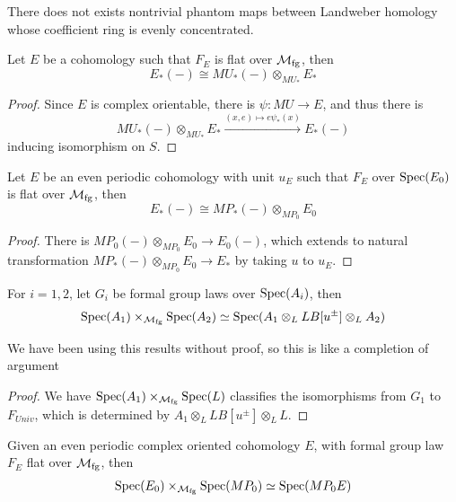 \begin{proposition}
    \cite{ChrLurie}
    There does not exists nontrivial phantom maps between Landweber homology whose coefficient ring is evenly concentrated.
\end{proposition}


\begin{lemma}
    Let $E$ be a cohomology such that $F_E$ is flat over $\mathcal{M}_{\mathrm{fg}}$, then 
    \[
        E_*(-)\cong MU_*(-)\otimes_{MU_*}E_*
    \]
\end{lemma}
\begin{proof}
    Since $E$ is complex orientable, there is $\psi:MU\to E$, and thus there is
    \[
        MU_*(-)\otimes_{MU_*}E_*\xrightarrow{(x,e)\mapsto e\psi_*(x)}E_*(-)
    \]inducing isomorphism on $S$.
\end{proof}

\begin{corollary}
Let $E$ be an even periodic cohomology with unit $u_E$ such that $F_E$ over $\operatorname{\mathrm{Spec}}(E_0)$ is flat over $\mathcal{M}_{\mathrm{fg}}$, then 
    \[
        E_*(-)\cong MP_*(-)\otimes_{MP_0}E_0
    \]
\end{corollary}
\begin{proof}
    There is $MP_0(-)\otimes_{MP_0}E_0\to E_0(-)$, which extends to natural transformation $MP_*(-)\otimes_{MP_0}E_0\to E_*$ by taking $u$ to $u_E$.
\end{proof}

\begin{proposition}
    \cite{AGGoerss}
    For $i=1,2$, let $G_i$ be formal group laws over $\operatorname{\mathrm{Spec}}(A_i)$, then 
    \[
    \operatorname{\mathrm{Spec}}(A_1)\times_{\mathcal{M}_{\mathrm{fg}}}\operatorname{\mathrm{Spec}}(A_2)\simeq \operatorname{\mathrm{Spec}}(A_1\otimes_L LB[u^{\pm}]\otimes_L A_2)
    \]
\end{proposition}
We have been using this results without proof, so this is like a completion of argument
\begin{proof}
    We have $\operatorname{\mathrm{Spec}}(A_1)\times_{\mathcal{M}_{\mathrm{fg}}}\operatorname{\mathrm{Spec}}(L)$ classifies the isomorphisms from $G_1$ to $F_{Univ}$, which is determined by $A_1\otimes_L LB[u^{\pm}]\otimes _L L$.
\end{proof}

\begin{corollary}
    Given an even periodic complex oriented cohomology $E$, with formal group law $F_E$ flat over $\mathcal{M}_{\mathrm{fg}}$, then
    \begin{align*}
        \operatorname{\mathrm{Spec}}(E_0)\times_{\mathcal{M}_{\mathrm{fg}}}\operatorname{\mathrm{Spec}}(MP_0)\simeq \operatorname{\mathrm{Spec}}(MP_0E)
    \end{align*}
\end{corollary}

